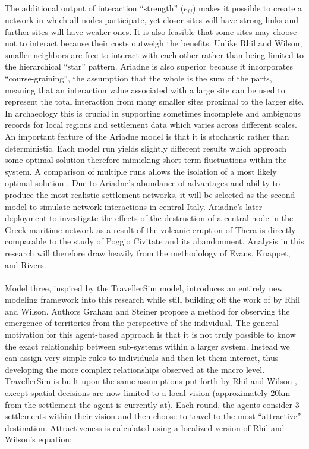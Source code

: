\documentclass[12pt,a4paper]{thesis}
\begin{document}
\paragraph{}
The additional output of interaction ``strength'' ($e_{ij}$) makes it possible to create a network in which all nodes participate, yet closer sites will have strong links and farther sites will have weaker ones. It is also feasible that some sites may choose not to interact because their costs outweigh the benefits. Unlike Rhil and Wilson, smaller neighbors are free to interact with each other rather than being limited to the hierarchical ``star'' pattern. Ariadne is also superior because it incorporates ``course-graining'', the assumption that the whole is the sum of the parts, meaning that an interaction value associated with a large site can be used to represent the total interaction from many smaller sites proximal to the larger site. In archaeology this is crucial in supporting sometimes incomplete and ambiguous records for local regions and settlement data which varies across different scales. An important feature of the Ariadne model is that it is stochastic rather than deterministic. Each model run yields slightly different results which approach some optimal solution therefore mimicking short-term fluctuations within the system. A comparison of multiple runs allows the isolation of a most likely optimal solution \citep[12]{ERK12}. Due to Ariadne's abundance of advantages and ability to produce the most realistic settlement networks, it will be selected as the second model to simulate network interactions in central Italy. Ariadne's later deployment to investigate the effects of the destruction of a central node in the Greek maritime network as a result of the volcanic eruption of Thera \citep{KnaRivEva11} is directly comparable to the study of Poggio Civitate and its abandonment. Analysis in this research will therefore draw heavily from the methodology of Evans, Knappet, and Rivers.
	
\paragraph{}
Model three, inspired by the TravellerSim model\footnotemark, introduces an entirely new modeling framework into this research while still building off the work of by Rhil and Wilson. Authors Graham and Steiner \citeyearpar{GraSte08} propose a method for observing the emergence of territories from the perspective of the individual. The general motivation for this agent-based approach is that it is not truly possible to know the exact relationship between sub-systems within a larger system. Instead we can assign very simple rules to individuals and then let them interact, thus developing the more complex relationships observed at the macro level. TravellerSim is built upon the same assumptions put forth by Rhil and Wilson \citep[64, 71]{RihWil91}, except spatial decisions are now limited to a local vision (approximately 20km from the settlement the agent is currently at). Each round, the agents consider 3 settlements within their vision and then choose to travel to the most ``attractive'' destination. Attractiveness is calculated using a localized version of Rhil and Wilson's equation:
\end{document}

